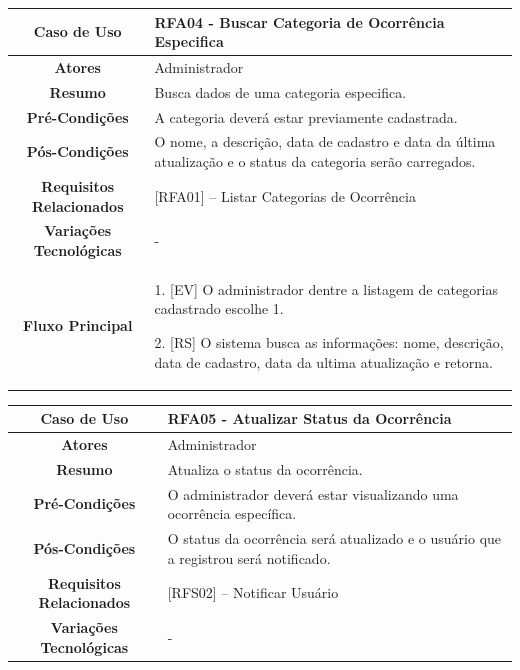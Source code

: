 \begin{apendicesenv}
\begin{quadro}[htb]
	\begin{tabular}{|c|p{11cm}|}
		\hline
		\textbf{Caso de Uso} & RFA04 - Buscar Categoria de Ocorrência Especifica \\ \hline
		\textbf{Atores} & Administrador \\ \hline
		\textbf{Resumo} & Busca dados de uma categoria especifica. \\ \hline
		\textbf{Pré-Condições} & A categoria deverá estar previamente cadastrada. \\ \hline
		\textbf{Pós-Condições} & O nome, a descrição, data de cadastro e data da última atualização e o status da categoria serão carregados. \\ \hline
		\textbf{Requisitos Relacionados} & [RFA01] -- Listar Categorias de Ocorrência \\ \hline
		\textbf{Variações Tecnológicas} & - \\ \hline
		
		\textbf{Fluxo Principal} &
		\parbox[t]{11cm}{
			\raggedright
			1. [EV] O administrador dentre a listagem de categorias cadastrado escolhe 1.\par
			2. [RS] O sistema busca as informações: nome, descrição, data de cadastro, data da ultima atualização e retorna.
		}
		\\ \hline
		
		\textbf{Tratamento de Exceções} &
		\parbox[t]{11cm}{
			\raggedright
		-
		}
		\\ \hline
	\end{tabular}
	
\end{quadro}


\begin{quadro}[htb]
	\centering
	\caption{\label{quadro_rfa05}Caso de Uso Atualizar Status da Ocorrência (Baixo Nível)}
	\small
	\renewcommand{\arraystretch}{1.1}
	
	\begin{tabular}{|c|p{11cm}|}
		\hline
		\textbf{Caso de Uso} & RFA05 - Atualizar Status da Ocorrência \\ \hline
		\textbf{Atores} & Administrador \\ \hline
		\textbf{Resumo} & Atualiza o status da ocorrência. \\ \hline
		\textbf{Pré-Condições} & O administrador deverá estar visualizando uma ocorrência específica. \\ \hline
		\textbf{Pós-Condições} & O status da ocorrência será atualizado e o usuário que a registrou será notificado. \\ \hline
		\textbf{Requisitos Relacionados} & [RFS02] -- Notificar Usuário \\ \hline
		\textbf{Variações Tecnológicas} & - \\ \hline
		

\end{tabular}
\end{quadro}
\end{apendicesenv}
